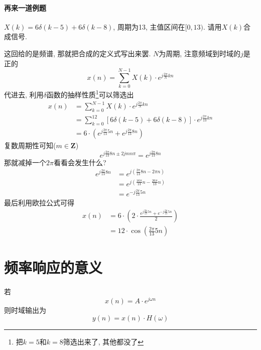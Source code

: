 \documentclass[a4paper]{report}
\begin{document}
\paragraph{再来一道例题}$X(k)=6\delta(k-5)+6\delta(k-8)$, 周期为13, 主值区间在$[0,13)$. 请用$X(k)$合成信号. 

这回给的是频谱, 那就把合成的定义式写出来罢. $N$为周期, 注意频域到时域的$j$是正的
\begin{equation}
  x(n)=\displaystyle\sum_{k=0}^{N-1}X(k)\cdot e^{j\frac{2\pi}{N}kn}
\end{equation}
代进去, 利用$\delta$函数的抽样性质\footnote{把$k=5$和$k=8$筛选出来了, 其他都没了}可以筛选出
\begin{align*}
  x(n)&=\displaystyle\sum_{k=0}^{N-1}X(k)\cdot e^{j\frac{2\pi}{N}kn}
  \\ &=\displaystyle\sum_{k=0}^{12}[6\delta(k-5)+6\delta(k-8)]\cdot e^{j\frac{2\pi}{13}kn}
  \\ &=6\cdot (e^{j\frac{2\pi}{13}5n}+e^{j\frac{2\pi}{13}8n})
\end{align*}
复数周期性可知($m\in \textbf{Z}$)
\begin{equation}
  e^{j\frac{2\pi}{13}8n\pm 2jmn\pi}=e^{j\frac{2\pi}{13}8n}
\end{equation}
那就减掉一个$2\pi$看看会发生什么? 
\begin{align*}
  e^{j\frac{2\pi}{13}8n}&=e^{j(\frac{2\pi}{13}8n- 2\pi n)}
  \\ &=e^{j(\frac{16\pi}{13}n-\frac{26\pi}{13}n)}
  \\ &=e^{-j\frac{2\pi}{13}5n}
\end{align*}
最后利用欧拉公式可得
\begin{align*}
  x(n)&=6\cdot (2\cdot\frac{e^{j\frac{2\pi}{13}5n}+e^{-j\frac{2\pi}{13}5n}}{2})
  \\ &=12\cdot \cos{(\frac{2\pi}{13}5n)}
\end{align*}
\section{频率响应的意义}
若
\begin{equation}
  x(n)=A\cdot e^{j\omega n}
\end{equation}
则时域输出为
\begin{equation}
  y(n)=x(n)\cdot H(\omega)
\end{equation}
\end{document}
